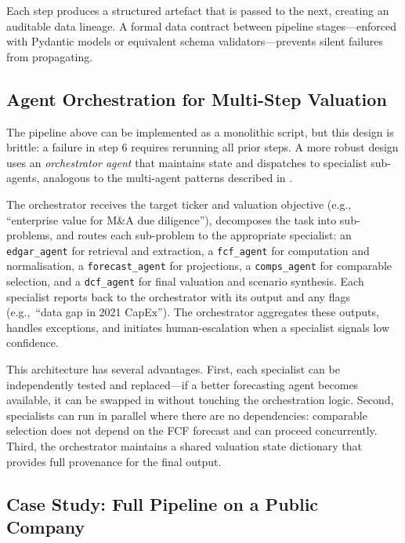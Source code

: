 \begin{context}
Each step produces a structured artefact that is passed to the next, creating an
auditable data lineage. A formal data contract between pipeline stages---enforced
with Pydantic models or equivalent schema validators---prevents silent failures
from propagating.

\subsection{Agent Orchestration for Multi-Step Valuation}
\label{subsec:bv-pipeline-orchestration}

The pipeline above can be implemented as a monolithic script, but this design is
brittle: a failure in step 6 requires rerunning all prior steps. A more robust
design uses an \emph{orchestrator agent} that maintains state and dispatches to
specialist sub-agents, analogous to the multi-agent patterns described in
.

The orchestrator receives the target ticker and valuation objective (e.g., ``enterprise
value for M\&A due diligence''), decomposes the task into sub-problems, and routes
each sub-problem to the appropriate specialist: an \texttt{edgar\_agent} for retrieval
and extraction, a \texttt{fcf\_agent} for computation and normalisation, a
\texttt{forecast\_agent} for projections, a \texttt{comps\_agent} for comparable
selection, and a \texttt{dcf\_agent} for final valuation and scenario synthesis. Each
specialist reports back to the orchestrator with its output and any flags (e.g.,\
``data gap in 2021 CapEx''). The orchestrator aggregates these outputs, handles
exceptions, and initiates human-escalation when a specialist signals low confidence.

This architecture has several advantages. First, each specialist can be independently
tested and replaced---if a better forecasting agent becomes available, it can be
swapped in without touching the orchestration logic. Second, specialists can run
in parallel where there are no dependencies: comparable selection does not depend on
the FCF forecast and can proceed concurrently. Third, the orchestrator maintains a
shared valuation state dictionary that provides full provenance for the final output.

\subsection{Case Study: Full Pipeline on a Public Company}
\label{subsec:bv-pipeline-casestudy}


\end{context}
